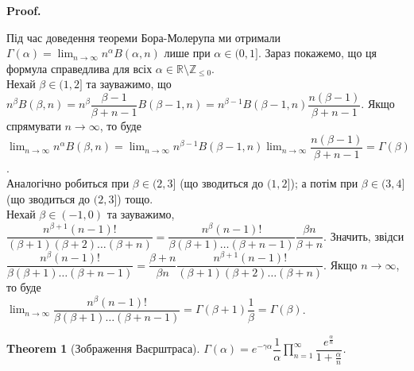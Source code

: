 \documentclass[a4paper, 10pt]{article}
\makeatletter
\def\huge{\displaystyle}
\def\qed{$\blacksquare$}
\theoremstyle{theoremdd}
\newtheorem{theorem}{Theorem}[subsection]
\theoremstyle{theoremdd}
\theoremstyle{theoremdd}
\theoremstyle{theoremdd}
\theoremstyle{theoremdd}
\theoremstyle{theoremdd}
\theoremstyle{theoremdd}
\theoremstyle{theoremdd}
\theoremstyle{theoremdd}
\renewenvironment{proof}[1][Proof.\\]{\par
\pushQED{\hfill \qed}%
\normalfont \topsep6\p@\@plus6\p@\relax
\trivlist
\item\relax
{\bfseries
#1\@addpunct{.}}\hspace\labelsep\ignorespaces
}{%
\popQED\endtrivlist\@endpefalse
}
\makeatother
\begin{document}
\begin{proof}
Під час доведення теореми Бора-Молерупа ми отримали $\Gamma(\alpha) = \displaystyle\lim_{n \to \infty} n^\alpha B(\alpha,n)$ лише при $\alpha \in (0,1]$. Зараз покажемо, що ця формула справедлива для всіх $\alpha \in \mathbb{R} \setminus \mathbb{Z}_{\leq 0}$.\\
Нехай $\beta \in (1,2]$ та зауважимо, що $n^\beta B(\beta,n) = n^\beta \dfrac{\beta-1}{\beta+n-1} B(\beta-1,n) = n^{\beta-1} B(\beta-1,n) \dfrac{n(\beta-1)}{\beta+n-1}$. Якщо спрямувати $n \to \infty$, то буде $\displaystyle\lim_{n \to \infty} n^\alpha B(\beta,n) = \lim_{n \to \infty} n^{\beta-1} B(\beta-1,n) \lim_{n \to \infty} \dfrac{n(\beta-1)}{\beta+n-1} = \Gamma(\beta)$.\\
Аналогічно робиться при $\beta \in (2,3]$ (що зводиться до $(1,2]$); а потім при $\beta \in (3,4]$ (що зводиться до $(2,3]$) тощо.\\
Нехай $\beta \in (-1,0)$ та зауважимо, $\dfrac{n^{\beta+1} (n-1)!}{(\beta+1) (\beta+2) \dots (\beta+n)} = \dfrac{n^\beta (n-1)!}{\beta (\beta+1) \dots (\beta+n-1)} \dfrac{\beta n}{\beta+n}$. Значить, звідси $\dfrac{n^\beta (n-1)!}{\beta (\beta+1) \dots (\beta+n-1)} = \dfrac{\beta+n}{\beta n} \dfrac{n^{\beta+1} (n-1)!}{(\beta+1) (\beta+2) \dots (\beta+n)}$. Якщо $n \to \infty$, то буде \\
$\displaystyle\lim_{n \to \infty} \dfrac{n^\beta (n-1)!}{\beta (\beta+1) \dots (\beta+n-1)} = \Gamma(\beta+1) \dfrac{1}{\beta} = \Gamma(\beta)$.
\end{proof}

\iffalse
\begin{proof}
$\Gamma(\alpha) = \huge\int_0^{+\infty} x^{\alpha-1} e^{-x}\,dx \overset{x = \ln \frac{1}{u}}{=} \int_0^{1} \ln^{\alpha-1} \dfrac{1}{u}\,du = \int_0^1 \left( -\ln u \right)^{\alpha-1}\,du = \int_0^1 \lim_{t \to 0} \left(\dfrac{1-u^t}{t} \right)^{\alpha-1}\,du = \\
= \int_0^1 \lim_{n \to \infty} \left( \dfrac{1-u^{\frac{1}{n}}}{\frac{1}{n}} \right)^{\alpha-1}\,du \overset{\Gamma \in C((0,+\infty))}{=} \lim_{n \to \infty} \int_0^1 n^{\alpha-1} (1-u^{\frac{1}{n}})^{\alpha-1}\,du \overset{u=s^n}{=} \lim_{n \to \infty} n^{\alpha} \int_0^1 s^{n-1} (1-s)^{\alpha-1}\,ds = \\ = \lim_{n \to \infty} n^{\alpha} B(n,\alpha)$
\end{proof}
\fi

\begin{theorem}[Зображення Ваєрштраса]
$\Gamma(\alpha) = e^{-\gamma \alpha} \dfrac{1}{\alpha} \displaystyle\prod_{n=1}^\infty \dfrac{e^{\frac{\alpha}{n}}}{1+\frac{\alpha}{n}}$.
\end{theorem}
\end{document}

